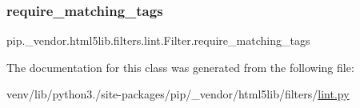 \subsubsection{\texorpdfstring{require\+\_\+matching\+\_\+tags}{require\_matching\_tags}}
{\footnotesize\ttfamily pip.\+\_\+vendor.\+html5lib.\+filters.\+lint.\+Filter.\+require\+\_\+matching\+\_\+tags}



The documentation for this class was generated from the following file\+:\begin{DoxyCompactItemize}
\item 
venv/lib/python3./site-\/packages/pip/\+\_\+vendor/html5lib/filters/\hyperlink{lint_8py}{lint.\+py}\end{DoxyCompactItemize}
